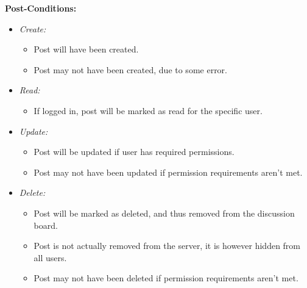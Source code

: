 \documentclass[11pt]{article}
\begin{document}
\begin{enumerate}
\textbf{Post-Conditions: }
\begin{itemize}

\item \textit{Create: }
	\begin{itemize}
	\item Post will have been created.
	\item Post may not have been created, due to some error.
	\end{itemize}
\item \textit{Read: }
	\begin{itemize}
	\item If logged in, post will be marked as read for the specific user.
	\end{itemize}
\item \textit{Update: }
	\begin{itemize}
	\item Post will be updated if user has required permissions.
	\item Post may not have been updated if permission requirements aren't met.
	\end{itemize}
\item \textit{Delete: }
	\begin{itemize}
	\item Post will be marked as deleted, and thus removed from the discussion board.
	\item Post is not actually removed from the server, it is however hidden from all users.
	\item Post may not have been deleted if permission requirements aren't met. 
	\end{itemize}

\end{itemize}
\end{enumerate}
\end{document}
